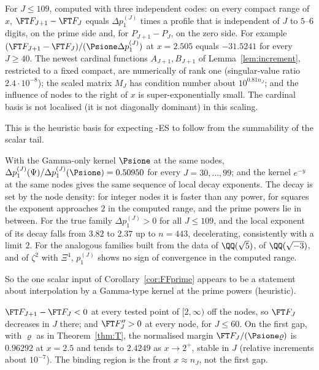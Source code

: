 \begin{observation}\label{obs:rankone}
For $J\le109$, computed with three independent codes: on every compact range of $x$, $\FT F_{J+1}-\FT F_J$ equals
$\Delta p_1^{(J)}$ times a profile that is independent of $J$ to $5$--$6$ digits, on the prime side and, for
$P_{J+1}-P_J$, on the zero side. For example $(\FT F_{J+1}-\FT F_J)/(\Psione\Delta p_1^{(J)})$ at $x=2.505$ equals $-31.5241$
for every $J\ge40$. The newest cardinal functions $A_{J+1},B_{J+1}$ of Lemma~\ref{lem:increment}, restricted to a fixed
compact, are numerically of rank one (singular-value ratio $2.4\cdot10^{-8}$); the scaled matrix $M_J$ has condition
number about $10^{0.81n_J}$; and the influence of nodes to the right of $x$ is super-exponentially small. The cardinal
basis is not localised (it is not diagonally dominant) in this scaling.
\end{observation}

This is the heuristic basis for expecting \hyp{ES} to follow from the summability of the scalar tail.

\begin{observation}\label{obs:universality}
With the Gamma-only kernel $\Psione$ at the same nodes, $\Delta p_1^{(J)}(\Psi)/\Delta p_1^{(J)}(\Psione)=0.50950$ for every
$J=30,\dots,99$; and the kernel $e^{-y}$ at the same nodes gives the same sequence of local decay exponents. The decay is
set by the node density: for integer nodes it is faster than any power, for squares the exponent approaches $2$ in the computed range, and the
prime powers lie in between. For the true family $\Delta p_1^{(J)}>0$ for all $J\le109$, and the local exponent of its decay
falls from $3.82$ to $2.37$ up to $n=443$, decelerating, consistently with a limit $2$. For the analogous families built
from the data of $\QQ(\sqrt5)$, of $\QQ(\sqrt{-3})$, and of $\zeta^2$ with $\Xi^4$, $p_1^{(J)}$ shows no sign of convergence in the computed range.
\end{observation}

So the one scalar input of Corollary~\ref{cor:FFprime} appears to be a statement about interpolation by a Gamma-type
kernel at the prime powers (heuristic).

\begin{observation}\label{obs:monotone}
$\FT F_{J+1}-\FT F_J<0$ at every tested point of $[2,\infty)$ off the nodes, so $\FT F_J$ decreases in $J$ there; and
$\FT F_J''>0$ at every node, for $J\le60$. On the first gap, with $\varrho$ as in Theorem~\ref{thm:T}, the normalised
margin $\FT F_J/(\Psione\varrho)$ is $0.96292$ at $x=2.5$ and tends to $2.4249$ as $x\to2^+$, stable in $J$ (relative
increments about $10^{-7}$). The binding region is the front $x\approx n_J$, not the first gap.
\end{observation}

